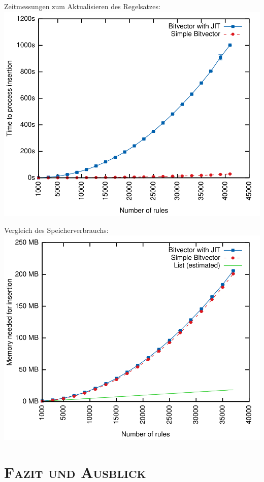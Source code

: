 \documentclass[xcolor=x11names,compress]{beamer}
\renewcommand{\(}{\begin{columns}}
\renewcommand{\)}{\end{columns}}
\newcommand{\<}[1]{\begin{column}{#1}}
\renewcommand{\>}{\end{column}}
\begin{document}
\begin{frame}
  Zeitmessungen zum Aktualisieren des Regelsatzes:
  \includegraphics[height=0.9\textheight]{figures/eval_time}
\end{frame}

\begin{frame}
  Vergleich des Speicherverbrauchs:
  \includegraphics[height=0.9\textheight]{figures/eval_mem}
\end{frame}

\section{\scshape Fazit und Ausblick}
\begin{frame}
  \centering\Huge{\insertsection}
\end{frame}
\end{document}
